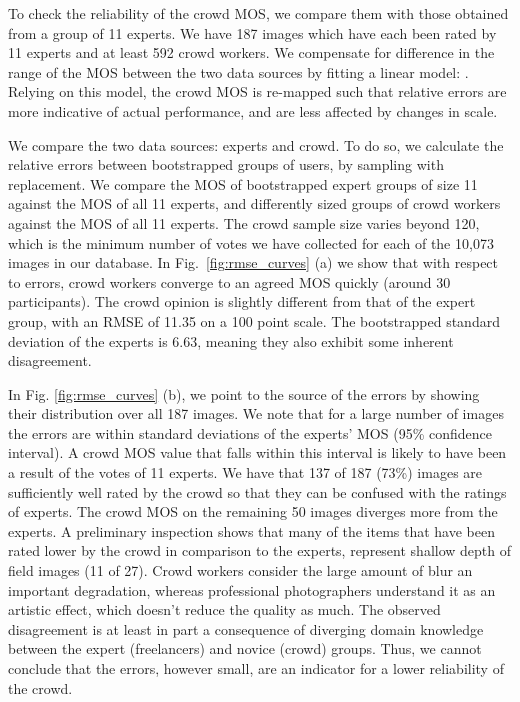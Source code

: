 \documentclass{article}
\begin{document}
To check the reliability of the crowd MOS, we compare them with those obtained from a group of 11 experts. We have 187 images which have each been rated by 11 experts and at least 592 crowd workers. We compensate for difference in the range of the MOS between the two data sources by fitting a linear model: . Relying on this model, the crowd MOS is re-mapped such that relative errors are more indicative of actual performance, and are less affected by changes in scale. 



We compare the two data sources: experts and crowd. To do so, we calculate the relative errors between bootstrapped groups of users, by sampling with replacement. We compare the MOS of bootstrapped expert groups of size 11 against the MOS of all 11 experts, and differently sized groups of crowd workers against the MOS of all 11 experts. The crowd sample size varies beyond 120, which is the minimum number of votes we have collected for each of the 10,073 images in our database. In Fig.~\ref{fig:rmse_curves} (a) we show that with respect to errors, crowd workers converge to an agreed MOS quickly (around 30 participants). The crowd opinion is slightly different from that of the expert group, with an RMSE of 11.35 on a 100 point scale. The bootstrapped standard deviation of the experts is 6.63, meaning they also exhibit some inherent disagreement.
 
In Fig. \ref{fig:rmse_curves} (b), we point to the source of the errors by showing their distribution over all 187 images. We note that for a large number of images the errors are within  standard deviations of the experts' MOS (95\% confidence interval). A crowd MOS value that falls within this interval is likely to have been a result of the votes of 11 experts. We have that 137 of 187 (73\%) images are sufficiently well rated by the crowd so that they can be confused with the ratings of experts. The crowd MOS on the remaining 50 images diverges more from the experts. A preliminary inspection shows that many of the items that have been rated lower by the crowd in comparison to the experts, represent shallow depth of field images (11 of 27). Crowd workers consider the large amount of blur an important degradation, whereas professional photographers understand it as an artistic effect, which doesn't reduce the quality as much. The observed disagreement is at least in part a consequence of diverging domain knowledge between the expert (freelancers) and novice (crowd) groups. Thus, we cannot conclude that the errors, however small, are an indicator for a lower reliability of the crowd.
\end{document}
